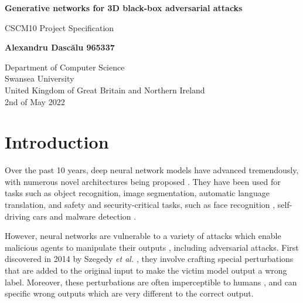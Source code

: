 \documentclass[11pt, a4paper, oneside]{article}
\begin{document}
\begin{titlepage}
   \begin{center}
       \vspace*{1cm}

       \textbf{\LARGE Generative networks for 3D black-box adversarial attacks}

       \vspace{1cm}
        CSCM10 Project Specification
            
       \vspace{1.5cm}

       \textbf{Alexandru Dascălu 965337}

       \vfill
            
       \vspace{0.8cm}
            
       Department of Computer Science\\
       Swansea University\\
       United Kingdom of Great Britain and Northern Ireland\\
       2nd of May 2022
            
   \end{center}
\end{titlepage}

\tableofcontents
\clearpage

\section{Introduction}
    \label{sec:introduction}

Over the past 10 years, deep neural network models have advanced tremendously, with numerous novel architectures being proposed \cite{alexnet, densenet, googlenet}. They have been used for tasks such as object recognition, image segmentation, automatic language translation, and safety and security-critical tasks, such as face recognition \cite{face_recognition}, self-driving cars \cite{self_driving_cars} and malware detection \cite{malware_detection}. 

However, neural networks are vulnerable to a variety of attacks which enable malicious agents to manipulate their outputs \cite{deep_leakage, trojan_attacks, poisoning_attacks, szegedy2014intriguing}, including adversarial attacks. First discovered in 2014 by Szegedy \textit{et al.} \cite{szegedy2014intriguing}, they involve crafting special perturbations that are added to the original input to make the victim model output a wrong label. Moreover, these perturbations are often imperceptible to humans \cite{szegedy2014intriguing}, and can specific wrong outputs which are very different to the correct output.
\end{document}
